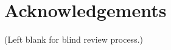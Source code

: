 \documentclass[letterpaper, 10 pt, conference]{ieeeconf}
\begin{document}
\section{Acknowledgements}
\label{sec:Acknowledgements}

(Left blank for blind review process.)




\end{document}
